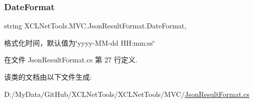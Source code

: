 \subsubsection{\texorpdfstring{Date\+Format}{DateFormat}}
{\footnotesize\ttfamily string X\+C\+L\+Net\+Tools.\+M\+V\+C.\+Json\+Result\+Format.\+Date\+Format\hspace{0.3cm}{\ttfamily [get]}, {\ttfamily [set]}}



格式化时间，默认值为\char`\"{}yyyy-\/\+M\+M-\/dd H\+H\+:mm\+:ss\char`\"{} 



在文件 Json\+Result\+Format.\+cs 第 27 行定义.



该类的文档由以下文件生成\+:\begin{DoxyCompactItemize}
\item 
D\+:/\+My\+Data/\+Git\+Hub/\+X\+C\+L\+Net\+Tools/\+X\+C\+L\+Net\+Tools/\+M\+V\+C/\hyperlink{_json_result_format_8cs}{Json\+Result\+Format.\+cs}\end{DoxyCompactItemize}
